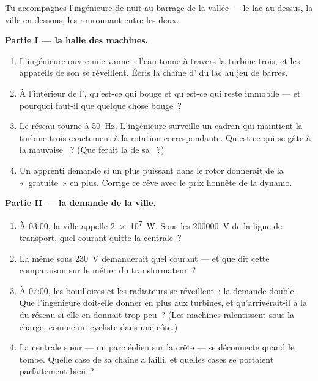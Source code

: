 \begin{problem}\label{pb:g9:alternator:1}
Tu accompagnes l'ingénieure de nuit au barrage de la vallée --- le lac
au-dessus, la ville en dessous, les  ronronnant entre les
deux.

\medskip\noindent\textbf{Partie I --- la halle des machines.}
\begin{enumerate}
  \item L'ingénieure ouvre une vanne~: l'eau tonne à travers la
        turbine trois, et les appareils de son  se
        réveillent. Écris la chaîne d' du lac au jeu de
        barres.
  \item À l'intérieur de l', qu'est-ce qui bouge et
        qu'est-ce qui reste immobile --- et pourquoi faut-il que
        quelque chose bouge~?
  \item Le réseau tourne à \qty{50}{Hz}. L'ingénieure surveille un
        cadran qui maintient la turbine trois exactement à la
        rotation correspondante. Qu'est-ce qui se gâte à la
        mauvaise ~? (Que ferait la  de sa
        ~?)
  \item Un apprenti demande si un  plus puissant dans le
        rotor donnerait de la  «~gratuite~» en plus.
        Corrige ce rêve avec le prix honnête de la dynamo.
\end{enumerate}

\medskip\noindent\textbf{Partie II --- la demande de la ville.}
\begin{enumerate}[resume]
  \item À 03:00, la ville appelle \qty{2e7}{W}. Sous les
        \qty{200000}{V} de la ligne de transport, quel courant
        quitte la centrale~?
  \item La même  sous \qty{230}{V} demanderait quel
        courant --- et que dit cette comparaison sur le métier du
        transformateur~?
  \item À 07:00, les bouilloires et les radiateurs se réveillent~:
        la demande double. Que l'ingénieure doit-elle donner en
        plus aux turbines, et qu'arriverait-il à la  du
        réseau si elle en donnait trop peu~? (Les machines
        ralentissent sous la charge, comme un cycliste dans une
        côte.)
  \item La centrale sœur --- un parc éolien sur la crête --- se
        déconnecte quand le  tombe. Quelle case de sa chaîne a
        failli, et quelles cases se portaient parfaitement bien~?
\end{enumerate}


\end{problem}
